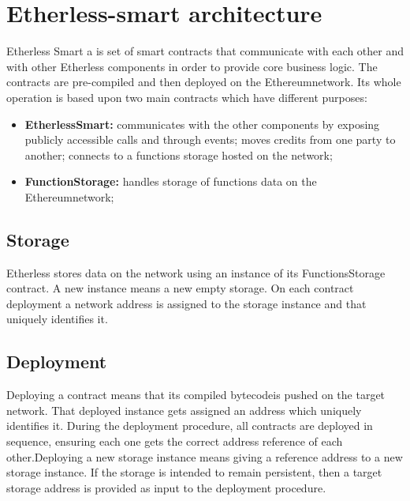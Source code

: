 \section{Etherless-smart architecture}
Etherless Smart a is set of smart contracts that communicate with each other and with other Etherless components in order to provide core business logic. The contracts are pre-compiled and then deployed on the Ethereum\glo network.\newline
Its whole operation is based upon two main contracts which have different purposes:
\begin{itemize}
	\item \textbf{EtherlessSmart:} communicates with the other components by exposing publicly accessible calls and through events; moves credits from one party to another; connects to a functions storage hosted on the network;
	\item \textbf{FunctionStorage:} handles storage of functions data on the Ethereum\glo network;
\end{itemize}
\subsection{Storage}
Etherless stores data on the network using an instance of its FunctionsStorage contract. A new instance means a new empty storage. On each contract deployment a network address is assigned to the storage instance and that uniquely identifies it.
\subsection{Deployment}
Deploying a contract means that its compiled bytecode\glo is pushed on the target network. That deployed instance gets assigned an address which uniquely identifies it. During the deployment procedure, all contracts are deployed in sequence, ensuring each one gets the correct address reference of each other.\newline Deploying a new storage instance means giving a reference address to a new storage instance. If the storage is intended to remain persistent, then a target storage address is provided as input to the deployment procedure.
